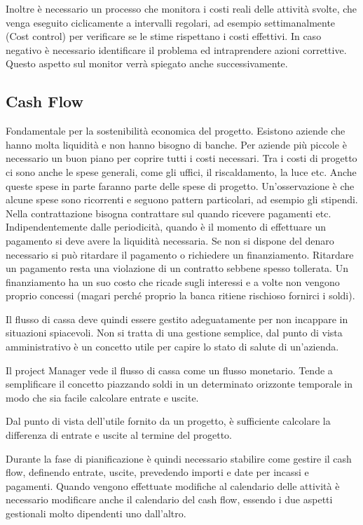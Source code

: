 \noindent Inoltre è necessario un processo che monitora i costi reali delle attività svolte, che venga eseguito ciclicamente a intervalli regolari, ad esempio settimanalmente (Cost control) per verificare se le stime rispettano i costi effettivi. In caso negativo è necessario identificare il problema ed intraprendere azioni correttive. Questo aspetto sul monitor verrà spiegato anche successivamente.
\subsection{Cash Flow}
Fondamentale per la sostenibilità economica del progetto. Esistono aziende che hanno molta liquidità e non hanno bisogno di banche. Per aziende più piccole è necessario un buon piano per coprire tutti i costi necessari. Tra i costi di progetto ci sono anche le spese generali, come gli uffici, il riscaldamento, la luce etc.
Anche queste spese in parte faranno parte delle spese di progetto. Un'osservazione è che alcune spese sono ricorrenti e seguono pattern particolari, ad esempio gli stipendi. Nella contrattazione bisogna contrattare sul quando ricevere pagamenti etc.
Indipendentemente dalle periodicità, quando è il momento di effettuare un pagamento si deve avere la liquidità necessaria. Se non si dispone del denaro necessario si può ritardare il pagamento o richiedere un finanziamento. Ritardare un pagamento resta una violazione di un contratto sebbene spesso tollerata. Un finanziamento ha un suo costo che ricade sugli interessi e a volte non vengono proprio concessi (magari perché proprio la banca ritiene rischioso fornirci i soldi).

\noindent Il flusso di cassa deve quindi essere gestito adeguatamente per non incappare in situazioni spiacevoli. Non si tratta di una gestione semplice, dal punto di vista amministrativo è un concetto utile per capire lo stato di salute di un'azienda.

\noindent Il project Manager vede il flusso di cassa come un flusso monetario. Tende a semplificare il concetto piazzando soldi in un determinato orizzonte temporale in modo che sia facile calcolare entrate e uscite.

\noindent Dal punto di vista dell'utile fornito da un progetto, è sufficiente calcolare la differenza di entrate e uscite al termine del progetto.

\noindent Durante la fase di pianificazione è quindi necessario stabilire come gestire il cash flow, definendo entrate, uscite, prevedendo importi e date per incassi e pagamenti. Quando vengono effettuate modifiche al calendario delle attività è necessario modificare anche il calendario del cash flow, essendo i due aspetti gestionali molto dipendenti uno dall'altro.

